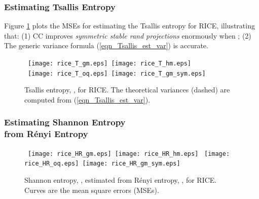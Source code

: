 \documentclass{sig-alternate}
\begin{document}
\vspace{0.2in}

\subsubsection{Estimating Tsallis Entropy}


Figure \ref{fig_rice_T} plots the MSEs for estimating the Tsallis entropy for RICE, illustrating that: (1) CC improves {\em symmetric stable rand projections} enormously when ; (2) The generic variance formula (\ref{eqn_Tsallis_est_var}) is accurate.

\begin{figure}[h]
\begin{center}\mbox{
{\texttt{[image: rice\_T\_gm.eps]}} \hspace{-0.1in}
{\texttt{[image: rice\_T\_hm.eps]}}}\\\mbox{
{\texttt{[image: rice\_T\_oq.eps]}} \hspace{-0.1in}
{\texttt{[image: rice\_T\_gm\_sym.eps]}}
}
\end{center}
\vspace{-0.15in}
\caption{Tsallis entropy, , for RICE. The theoretical variances (dashed) are computed from (\ref{eqn_Tsallis_est_var}). }\label{fig_rice_T}
\end{figure}

\vspace{0.2in}
\subsubsection{Estimating Shannon Entropy\\ from R\'enyi Entropy}


\begin{figure}[h]
\begin{center}\mbox{
{\texttt{[image: rice\_HR\_gm.eps]}} \hspace{-0.1in}
{\texttt{[image: rice\_HR\_hm.eps]}}}\vspace{-0.1in}
\mbox{
{\texttt{[image: rice\_HR\_oq.eps]}} \hspace{-0.1in}
{\texttt{[image: rice\_HR\_gm\_sym.eps]}}\vspace{-0.1in}
}
\end{center}
\vspace{-0.25in}
\caption{Shannon entropy, , estimated from R\'enyi entropy, , for RICE. Curves are the mean square errors (MSEs). }\label{fig_rice_HR}
\end{figure}
\end{document}
